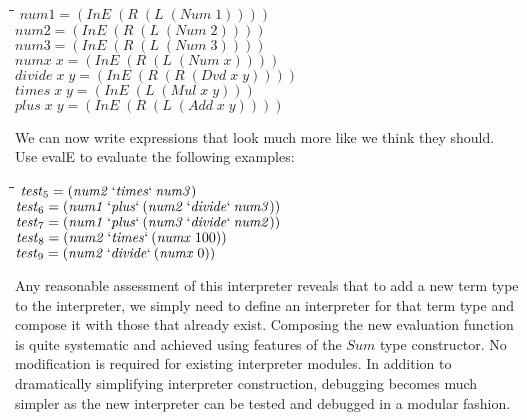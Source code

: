 \documentclass[10pt]{article}
\newlength{\lwidth}\setlength{\lwidth}{4.5cm}
\newlength{\cwidth}\setlength{\cwidth}{8mm} %
\newcommand{\Conid}[1]{\mathit{#1}}
\newcommand{\Varid}[1]{\mathit{#1}}
\begin{document}
\begin{tabbing}
\qquad\=\hspace{\lwidth}\=\hspace{\cwidth}\=\+\kill
${\Varid{num1}\mathrel{=}(\Conid{InE}\;(\Conid{R}\;(\Conid{L}\;(\Conid{Num}\;\mathrm{1}))))}$\\
${\Varid{num2}\mathrel{=}(\Conid{InE}\;(\Conid{R}\;(\Conid{L}\;(\Conid{Num}\;\mathrm{2}))))}$\\
${\Varid{num3}\mathrel{=}(\Conid{InE}\;(\Conid{R}\;(\Conid{L}\;(\Conid{Num}\;\mathrm{3}))))}$\\
${\Varid{numx}\;\Varid{x}\mathrel{=}(\Conid{InE}\;(\Conid{R}\;(\Conid{L}\;(\Conid{Num}\;\Varid{x}))))}$\\
${\Varid{divide}\;\Varid{x}\;\Varid{y}\mathrel{=}(\Conid{InE}\;(\Conid{R}\;(\Conid{R}\;(\Conid{Dvd}\;\Varid{x}\;\Varid{y}))))}$\\
${\Varid{times}\;\Varid{x}\;\Varid{y}\mathrel{=}(\Conid{InE}\;(\Conid{L}\;(\Conid{Mul}\;\Varid{x}\;\Varid{y})))}$\\
${\Varid{plus}\;\Varid{x}\;\Varid{y}\mathrel{=}(\Conid{InE}\;(\Conid{R}\;(\Conid{L}\;(\Conid{Add}\;\Varid{x}\;\Varid{y}))))}$
\end{tabbing}
We can now write expressions that look much more like we think they
should.  Use evalE to evaluate the following examples:

\begin{tabbing}
\qquad\=\hspace{\lwidth}\=\hspace{\cwidth}\=\+\kill
${\Varid{test}_5\mathrel{=}(\Varid{num2}\mathbin{`\Varid{times}`}\Varid{num3})}$\\
${}$\\
${\Varid{test}_6\mathrel{=}(\Varid{num1}\mathbin{`\Varid{plus}`}(\Varid{num2}\mathbin{`\Varid{divide}`}\Varid{num3}))}$\\
${}$\\
${\Varid{test}_7\mathrel{=}(\Varid{num1}\mathbin{`\Varid{plus}`}(\Varid{num3}\mathbin{`\Varid{divide}`}\Varid{num2}))}$\\
${}$\\
${\Varid{test}_8\mathrel{=}(\Varid{num2}\mathbin{`\Varid{times}`}(\Varid{numx}\;\mathrm{100}))}$\\
${}$\\
${\Varid{test}_9\mathrel{=}(\Varid{num2}\mathbin{`\Varid{divide}`}(\Varid{numx}\;\mathrm{0}))}$
\end{tabbing}
Any reasonable assessment of this interpreter reveals that to add a
new term type to the interpreter, we simply need to define an
interpreter for that term type and compose it with those that already
exist.  Composing the new evaluation function is quite systematic and
achieved using features of the \ensuremath{\Conid{Sum}} type constructor.  No
modification is required for existing interpreter modules.  In
addition to dramatically simplifying interpreter construction,
debugging becomes much simpler as the new interpreter can be tested
and debugged in a modular fashion.
\end{document}
